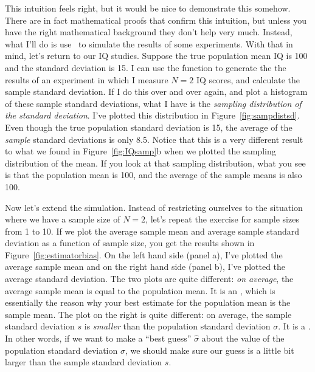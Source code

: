 This intuition feels right, but it would be nice to demonstrate this somehow. There are in fact mathematical proofs that confirm this intuition, but unless you have the right mathematical background they don't help very much. Instead, what I'll do is use \R\ to simulate the results of some experiments. With that in mind, let's return to our IQ studies. Suppose the true population mean IQ is 100 and the standard deviation is 15. I can use the  function to generate the the results of an experiment in which I measure $N=2$ IQ scores, and calculate the sample standard deviation. If I do this over and over again, and plot a histogram of these sample standard deviations, what I have is the {\it sampling distribution of the standard deviation}. I've plotted this distribution in Figure~\ref{fig:sampdistsd}. Even though the true population standard deviation is 15, the average of the {\it sample} standard deviations is only 8.5. Notice that this is a very different result to what we found in Figure~\ref{fig:IQsamp}b when we plotted the sampling distribution of the mean. If you look at that sampling distribution, what you see is that the population mean is 100, and the average of the sample means is also 100. 

Now let's extend the simulation. Instead of restricting ourselves to the situation where we have a sample size of $N=2$, let's repeat the exercise for sample sizes from 1 to 10. If we plot the average sample mean and average sample standard deviation as a function of sample size, you get the results shown in Figure~\ref{fig:estimatorbias}. On the left hand side (panel a), I've plotted the average sample mean and on the right hand side (panel b), I've plotted the average standard deviation. The two plots are quite different: {\it on average}, the average sample mean is equal to the population mean. It is an , which is essentially the reason why your best estimate for the population mean is the sample mean. The plot on the right is quite different: on average, the sample standard deviation $s$ is {\it smaller} than the population standard deviation $\sigma$. It is a . In other words, if we want to make a ``best guess'' $\hat\sigma$ about the value of the population standard deviation $\sigma$, we should make sure our guess is a little bit larger than the sample standard deviation $s$. 


